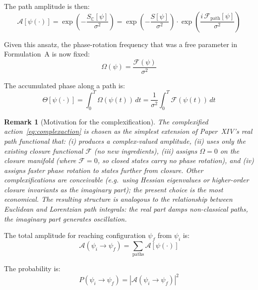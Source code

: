 \documentclass[12pt]{article}
\newtheorem{remark}[theorem]{Remark}
\newcommand{\Fcal}{\mathcal{F}}
\begin{document}
The path amplitude is then:
\begin{equation}\label{eq:formC}
    \mathcal{A}[\psi(\cdot)] = \exp\!\left(-\frac{S_{\mathbb{C}}[\psi]}{\sigma^2}\right) = \exp\!\left(-\frac{S[\psi]}{\sigma^2}\right) \cdot \exp\!\left(\frac{i\, \Fcal_{\mathrm{path}}[\psi]}{\sigma^2}\right)
\end{equation}

Given this ansatz, the phase-rotation frequency that was a free parameter in Formulation~A is now fixed:
\begin{equation}\label{eq:omega_derived}
    \Omega(\psi) = \frac{\Fcal(\psi)}{\sigma^2}
\end{equation}

The accumulated phase along a path is:
\begin{equation}
    \Theta[\psi(\cdot)] = \int_0^T \Omega(\psi(t))\, dt = \frac{1}{\sigma^2}\int_0^T \Fcal(\psi(t))\, dt
\end{equation}

\begin{remark}[Motivation for the complexification]
The complexified action~\eqref{eq:complexaction} is chosen as the simplest extension of Paper~XIV's real path functional that: (i) produces a complex-valued amplitude, (ii) uses only the existing closure functional $\Fcal$ (no new ingredients), (iii) assigns $\Omega = 0$ on the closure manifold (where $\Fcal = 0$, so closed states carry no phase rotation), and (iv) assigns faster phase rotation to states further from closure. Other complexifications are conceivable (e.g.\ using Hessian eigenvalues or higher-order closure invariants as the imaginary part); the present choice is the most economical. The resulting structure is analogous to the relationship between Euclidean and Lorentzian path integrals: the real part damps non-classical paths, the imaginary part generates oscillation.
\end{remark}

The total amplitude for reaching configuration $\psi_f$ from $\psi_i$ is:
\begin{equation}\label{eq:totalamp}
    \mathcal{A}(\psi_i \to \psi_f) = \sum_{\text{paths}} \mathcal{A}[\psi(\cdot)]
\end{equation}

The probability is:
\begin{equation}\label{eq:probability}
    P(\psi_i \to \psi_f) = \left|\mathcal{A}(\psi_i \to \psi_f)\right|^2
\end{equation}
\end{document}
